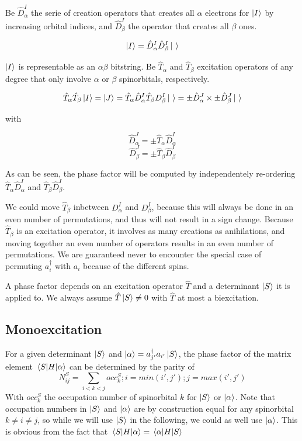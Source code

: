 Be $\hat D_\alpha^I$ the serie of creation operators that creates all $\alpha$ electrons for $\ket I$ by increasing orbital indices, and $\hat D_\beta^I$ the operator that creates all $\beta$ ones.

$$\ket I = \hat D_\alpha^I \hat D_\beta^I \ket \ $$


$\ket I$ is representable as an $\alpha \beta$ bitstring. Be $\hat T_\alpha$ and $\hat T_\beta$ excitation operators of any degree that only involve $\alpha$ or $\beta$ spinorbitals, respectively.

$$\hat T_\alpha \hat T_\beta \ket I = \ket J = \hat T_\alpha \hat D_\alpha^I \hat T_\beta D_\beta^I \ket \ = \pm \hat D_\alpha^J \times \pm \hat D_\beta^J \ket \ $$

with

$$\hat D_\alpha^J = \pm \hat T_\alpha \hat D_\alpha^I$$
$$\hat D_\beta^J = \pm \hat T_\beta \hat D_\beta^I$$

As can be seen, the phase factor will be computed by independentely re-ordering $\hat T_\alpha \hat D_\alpha^I$ and $\hat T_\beta \hat D_\beta^I$.

We could move $\hat T_\beta$ inbetween $D_\alpha^I$ and $D_\beta^I$, because this will always be done in an even number of permutations, and thus will not result in a sign change. Because $\hat T_\beta$ is an excitation operator, it involves as many creations as anihilations, and moving together an even number of operators results in an even number of permutations. We are guaranteed never to encounter the special case of permuting $a^\dagger_i$ with $a_i$ because of the different spins.






A phase factor depends on an excitation operator $\hat T$ and a determinant $\ket S$ it is applied to. We always assume $\hat T \ket S \neq 0$ with $\hat T$ at most a biexcitation. 



\subsection{Monoexcitation}


For a given determinant $\ket S$ and $\ket{\alpha}=a^\dagger_{j'} a_{i'}  \ket S$, the phase factor of the matrix element $\mel{S}{H}{\alpha}$ can be determined by the parity of
$$N^{S}_{ij}=\sum_{i<k<j} occ^{S}_{k};i=min(i',j');j=max(i',j')$$
With $occ^{S}_{k}$ the occupation number of spinorbital $k$ for $\ket S$ or $\ket \alpha$. Note that occupation numbers in $\ket S$ and $\ket \alpha$ are by construction equal for any spinorbital $k \neq i \neq j$, so while we will use $\ket S$ in the following, we could as well use $\ket \alpha$. This is obvious from the fact that $\mel{S}{H}{\alpha}=\mel{\alpha}{H}{S}$  

